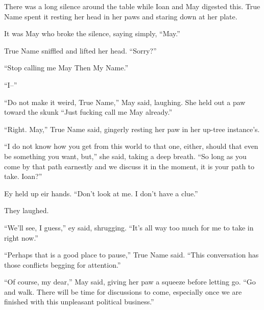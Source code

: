 There was a long silence around the table while Ioan and May digested this. True Name spent it resting her head in her paws and staring down at her plate.

It was May who broke the silence, saying simply, ``May.''

True Name sniffled and lifted her head. ``Sorry?''

``Stop calling me May Then My Name.''

``I--''

``Do not make it weird, True Name,'' May said, laughing. She held out a paw toward the skunk ``Just fucking call me May already.''

``Right. May,'' True Name said, gingerly resting her paw in her up-tree instance's.

``I do not know how you get from this world to that one, either, should that even be something you want, but,'' she said, taking a deep breath. ``So long as you come by that path earnestly and we discuss it in the moment, it is your path to take. Ioan?''

Ey held up eir hands. ``Don't look at me. I don't have a clue.''

They laughed.

``We'll see, I guess,'' ey said, shrugging. ``It's all way too much for me to take in right now.''

``Perhaps that is a good place to pause,'' True Name said. ``This conversation has those conflicts begging for attention.''

``Of course, my dear,'' May said, giving her paw a squeeze before letting go. ``Go and walk. There will be time for discussions to come, especially once we are finished with this unpleasant political business.''
